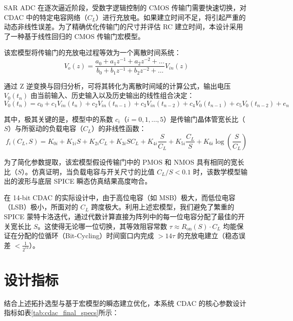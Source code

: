 SAR ADC 在逐次逼近阶段，受数字逻辑控制的 CMOS 传输门需要快速切换，对 CDAC 中的特定电容网络（$C_L$）进行充放电。如果建立时间不足，将引起严重的动态非线性误差。为了精确优化传输门的尺寸并评估 RC 建立时间，本设计采用了一种基于线性回归的 CMOS 传输门宏模型。

该宏模型将传输门的充放电过程等效为一个离散时间系统：
$$ V_o(z) = \frac{a_0 + a_1 z^{-1} + a_2 z^{-2} + \dots}{b_0 + b_1 z^{-1} + b_2 z^{-2} + \dots} V_{in}(z) $$

通过 Z 逆变换与回归分析，可将其转化为离散时间域的计算公式，输出电压 $V_0(t_n)$ 由当前输入、历史输入以及历史输出的线性组合决定：
$$ V_0(t_n) = c_0 + c_1 V_{in}(t_n) + c_2 V_{in}(t_{n-1}) + c_3 V_{in}(t_{n-2}) + c_4 V_0(t_{n-1}) + c_5 V_0(t_{n-2}) + e_n $$

其中，极其关键的是，模型中的系数 $c_i$（$i=0,1,\dots,5$）是传输门晶体管宽长比（$S$）与所驱动的负载电容（$C_L$）的非线性函数：
$$ f_i(C_L,S) = K_{0i} + K_{1i}S + K_{2i}C_L + K_{3i}SC_L + K_{4i}\frac{S}{C_L} + K_{5i}\frac{C_L}{S} + K_{6i}\log\left(\frac{S}{C_L}\right) $$

为了简化参数提取，该宏模型假设传输门中的 PMOS 和 NMOS 具有相同的宽长比（$S$）。仿真证明，当负载电容与开关尺寸的比值 $C_L/S < 0.1$ 时，该数学模型输出的波形与底层 SPICE 瞬态仿真结果高度吻合。

在 14-bit CDAC 的实际设计中，由于高位电容（如 MSB）极大，而低位电容（LSB）极小，所面对的 $C_L$ 跨度极大。利用上述宏模型，我们避免了繁重的 SPICE 蒙特卡洛迭代，通过代数计算直接为阵列中的每一位电容分配了最佳的开关宽长比 $S$。这使得无论哪一位切换，其等效阻容常数 $\tau \approx R_{\mathrm{on}}(S) \cdot C_L$ 均能保证在分配的位循环（Bit-Cycling）时间窗口内完成 $> 14 \tau$ 的充放电建立（稳态误差 $< \frac{1}{2^{14}}$）。

\section{设计指标}

结合上述拓扑选型与基于宏模型的瞬态建立优化，本系统 CDAC 的核心参数设计指标如表\ref{tab:cdac_final_specs}所示：

